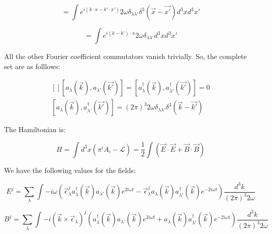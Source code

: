 \documentclass[a4]{article}
\begin{document}
    \begin{equation}
        [a_{\lambda} (\vec{k}), a_{\lambda'}^{\dagger} (\vec{k'})] = \int e^{i (k  \cdot x -k'  \cdot x')} 2 \omega \delta_{\lambda \lambda'} \delta^{3} (\vec{x} - \vec{x'}) d^{3} x d^{3} x'
    \end{equation}
    
    \begin{equation}
        [a_{\lambda} (\vec{k}), a_{\lambda'}^{\dagger} (\vec{k'})] = \int e^{i (k-k') \cdot x} 2 \omega \delta_{\lambda \lambda'} d^{3} x d^{3} x'
    \end{equation}

    All the other Fourier coefficient commutators vanish trivially. So, the complete set are as folllows:

    \begin{framed}
        \begin{equation}
            \begin{aligned} []
                [a_{\lambda} (\vec{k}), a_{\lambda'} (\vec{k'})] = [a_{\lambda}^{\dagger} (\vec{k}), a_{\lambda'}^{\dagger} (\vec{k'})] = 0 \\
                [a_{\lambda} (\vec{k}), a_{\lambda'}^{\dagger} (\vec{k'})] = (2 \pi)^{3} 2 \omega \delta_{\lambda \lambda'} \delta^{3} (\vec{k} - \vec{k'})
            \end{aligned}
        \end{equation}
    \end{framed}

    The Hamiltonian is:

    \begin{equation}
        H = \int d^{3} x (\pi^{i} \dot{A}_{i} - \mathcal{L}) = \frac{1}{2} \int (\vec{E} \cdot \vec{E} + \vec{B} \cdot \vec{B})
    \end{equation}

    We have the following values for the fields:

    \begin{equation}
        E^{j} = \sum_{\lambda} \int - i \omega (\vec{\epsilon}_{\lambda}^{j} a^{\dagger}_{\lambda} (\vec{k}) a_{\lambda'} (\vec{k}) e^{2 i \omega t} - \vec{\epsilon}_{\lambda}^{j} a_{\lambda} (\vec{k}) a^{\dagger}_{\lambda'} (\vec{k}) e^{- 2 i \omega t}) \frac{d^{3} k}{(2 \pi)^{3} 2 \omega}
    \end{equation}

    \begin{equation}
        B^{j} = \sum_{\lambda} \int - i (\vec{k} \times \vec{\epsilon}_{\lambda})^{j} (a^{\dagger}_{\lambda} (\vec{k}) a_{\lambda'} (\vec{k}) e^{2 i \omega t} + a_{\lambda} (\vec{k}) a^{\dagger}_{\lambda'} (\vec{k}) e^{- 2 i \omega t}) \frac{d^{3} k}{(2 \pi)^{3} 2 \omega}
    \end{equation}
\end{document}
